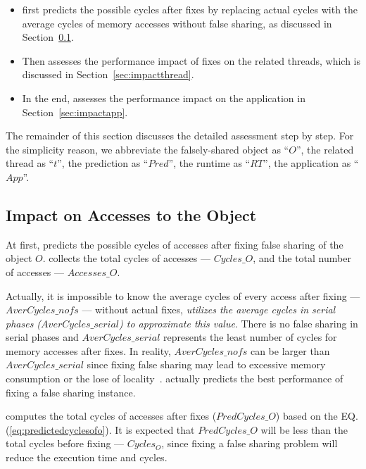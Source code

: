 \begin{itemize}
\item \cheetah{} first predicts the possible cycles after fixes by replacing actual cycles with the average cycles of memory accesses without false sharing, as discussed in Section~\ref{sec:impactobject}. 

\item Then \cheetah{} assesses the performance impact of fixes on the related threads, which is discussed in Section~\ref{sec:impactthread}. 
 
\item In the end, \cheetah{} assesses the performance impact on the application in Section~\ref{sec:impactapp}. 
\end{itemize}

The remainder of this section discusses the detailed assessment step by step. For the simplicity reason, we abbreviate the falsely-shared object as ``$O$'', the related thread as ``$t$'', the prediction as ``$Pred$'', the runtime as ``$RT$'', the application as ``$App$''. 

\subsection{Impact on Accesses to the Object}
\label{sec:impactobject}

At first, \cheetah{} predicts the possible cycles of accesses after fixing false sharing of the object $O$. \cheetah{} collects the total cycles of accesses --- $Cycles\_O$, and the total number of accesses --- $Accesses\_O$. 

Actually, it is impossible to know the average cycles of every access after fixing --- $AverCycles\_{nofs}$ --- without actual fixes, {\it \cheetah{} utilizes the average cycles in serial phases ($AverCycles\_{serial}$) to approximate this value}. There is no false sharing in serial phases and $AverCycles\_{serial}$ represents the least number of cycles for memory accesses after fixes. In reality, $AverCycles\_{nofs}$ can be larger than $AverCycles\_{serial}$ since fixing false sharing may lead to excessive memory consumption or the lose of locality~\cite{qinzhao}. \cheetah{} actually predicts the best performance of fixing a false sharing instance. 
 
\cheetah{} computes the total cycles of accesses after fixes ($PredCycles\_{O}$) based on the EQ.(\ref{eq:predictedcyclesofo}).  It is expected that $PredCycles\_{O}$ will be less than the total cycles before fixing --- $Cycles_O$, since fixing a false sharing problem will reduce the execution time and cycles.  

